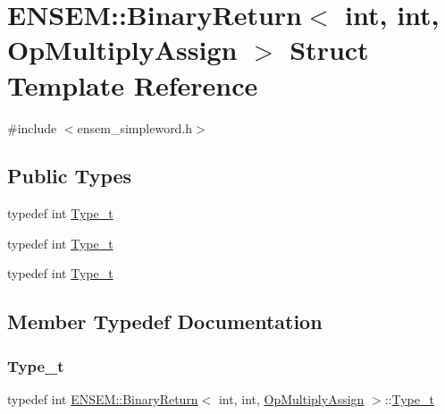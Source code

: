 \hypertarget{structENSEM_1_1BinaryReturn_3_01int_00_01int_00_01OpMultiplyAssign_01_4}{}\section{E\+N\+S\+EM\+:\+:Binary\+Return$<$ int, int, Op\+Multiply\+Assign $>$ Struct Template Reference}
\label{structENSEM_1_1BinaryReturn_3_01int_00_01int_00_01OpMultiplyAssign_01_4}


{\ttfamily \#include $<$ensem\+\_\+simpleword.\+h$>$}

\subsection*{Public Types}
\begin{DoxyCompactItemize}
\item 
typedef int \mbox{\hyperlink{structENSEM_1_1BinaryReturn_3_01int_00_01int_00_01OpMultiplyAssign_01_4_a7a8dcc18d85fb6a01288cb15f4bc4cdf}{Type\+\_\+t}}
\item 
typedef int \mbox{\hyperlink{structENSEM_1_1BinaryReturn_3_01int_00_01int_00_01OpMultiplyAssign_01_4_a7a8dcc18d85fb6a01288cb15f4bc4cdf}{Type\+\_\+t}}
\item 
typedef int \mbox{\hyperlink{structENSEM_1_1BinaryReturn_3_01int_00_01int_00_01OpMultiplyAssign_01_4_a7a8dcc18d85fb6a01288cb15f4bc4cdf}{Type\+\_\+t}}
\end{DoxyCompactItemize}


\subsection{Member Typedef Documentation}
\mbox{\label{structENSEM_1_1BinaryReturn_3_01int_00_01int_00_01OpMultiplyAssign_01_4_a7a8dcc18d85fb6a01288cb15f4bc4cdf}} 
\subsubsection{\texorpdfstring{Type\_t}{Type\_t}\hspace{0.1cm}{\footnotesize\ttfamily [1/3]}}
{\footnotesize\ttfamily typedef int \mbox{\hyperlink{structENSEM_1_1BinaryReturn}{E\+N\+S\+E\+M\+::\+Binary\+Return}}$<$ int, int, \mbox{\hyperlink{structENSEM_1_1OpMultiplyAssign}{Op\+Multiply\+Assign}} $>$\+::\mbox{\hyperlink{structENSEM_1_1BinaryReturn_3_01int_00_01int_00_01OpMultiplyAssign_01_4_a7a8dcc18d85fb6a01288cb15f4bc4cdf}{Type\+\_\+t}}}

